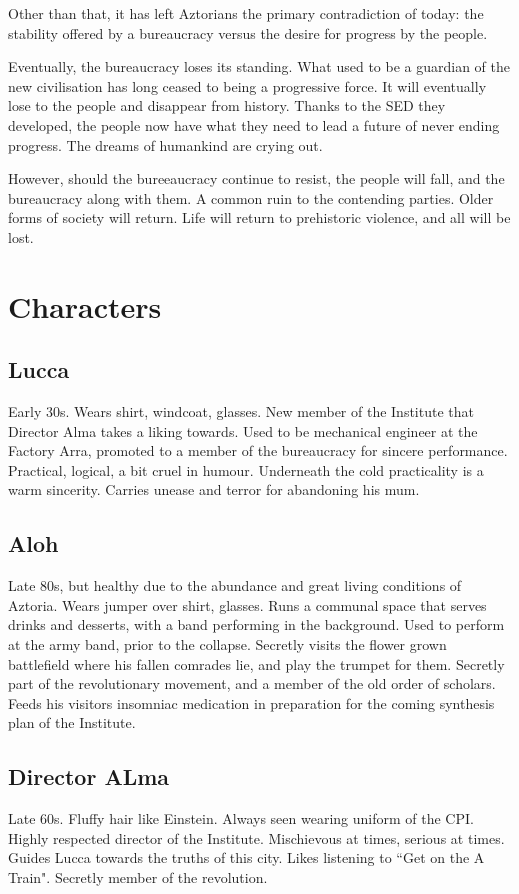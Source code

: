 \documentclass[11pt]{article}
\begin{document}
	Other than that, it has left Aztorians the primary contradiction of today: the stability offered by a bureaucracy versus the desire for progress by the people.
	
	Eventually, the bureaucracy loses its standing. 
	What used to be a guardian of the new civilisation has long ceased to being a progressive force. 
	It will eventually lose to the people and disappear from history. 
	Thanks to the SED they developed, the people now have what they need to lead a future of never ending progress.
	The dreams of humankind are crying out.
	
	However, should the bureeaucracy continue to resist, the people will fall, and the bureaucracy along with them. 
	A common ruin to the contending parties.
	Older forms of society will return. 
	Life will return to prehistoric violence, and all will be lost.
\newpage






\section{Characters}
	\subsection{Lucca}
	Early 30s. Wears shirt, windcoat, glasses.
	New member of the Institute that Director Alma takes a liking towards.
	Used to be mechanical engineer at the Factory Arra, promoted to a member of the bureaucracy for sincere performance.
	Practical, logical, a bit cruel in humour. 
	Underneath the cold practicality is a warm sincerity.
	Carries unease and terror for abandoning his mum.
	\subsection{Aloh}
	Late 80s, but healthy due to the abundance and great living conditions of Aztoria.
	Wears jumper over shirt, glasses.
	Runs a communal space that serves drinks and desserts, with a band performing in the background. 
	Used to perform at the army band, prior to the collapse.
	Secretly visits the flower grown battlefield where his fallen comrades lie, and play the trumpet for them.
	Secretly part of the revolutionary movement, and a member of the old order of scholars.
	Feeds his visitors insomniac medication in preparation for the coming synthesis plan of the Institute.
	\subsection{Director ALma}
	Late 60s. 
	Fluffy hair like Einstein. 
	Always seen wearing uniform of the CPI.
	Highly respected director of the Institute.
	Mischievous at times, serious at times. 
	Guides Lucca towards the truths of this city.
	Likes listening to ``Get on the A Train".
	Secretly member of the revolution.
\end{document}
